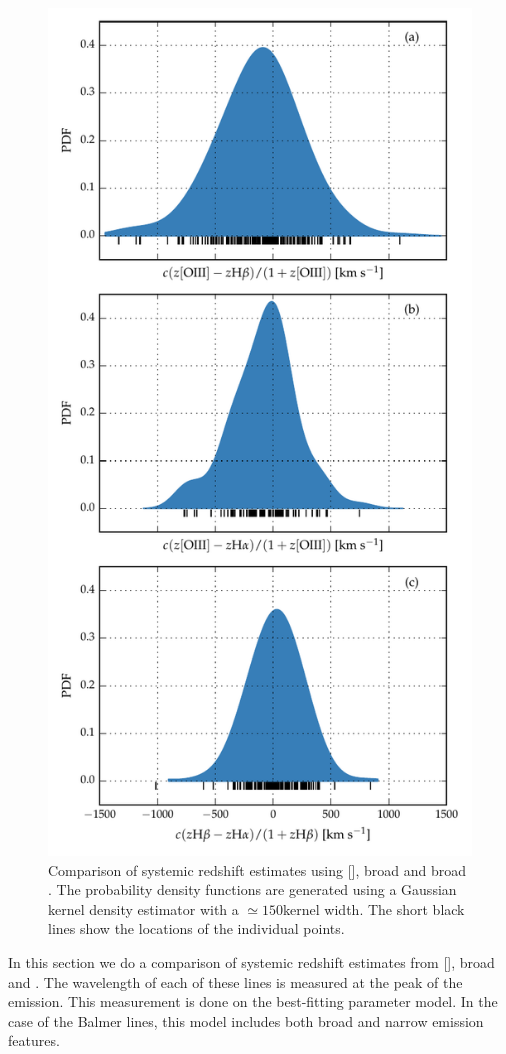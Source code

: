 \begin{figure}
    \centering
    \includegraphics[width=0.8\linewidth]{figures/chapter04/redshift_comparison.pdf} 
    \caption[{Comparison of systemic redshift estimates using [], broad \hb and broad \hans.}]{Comparison of systemic redshift estimates using [], broad \hb and broad \hans. The probability density functions are generated using a Gaussian kernel density estimator with a $\simeq150$\kms kernel width. The short black lines show the locations of the individual points.}       
    \label{fig:redshift_comparison}
\end{figure}

In this section we do a comparison of systemic redshift estimates from [], broad \hb and \hans. 
The wavelength of each of these lines is measured at the peak of the emission. 
This measurement is done on the best-fitting parameter model. 
In the case of the Balmer lines, this model includes both broad and narrow emission features. 

